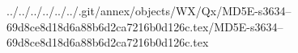 ../../../../../../.git/annex/objects/WX/Qx/MD5E-s3634--69d8ce8d18d6a88b6d2ca7216b0d126c.tex/MD5E-s3634--69d8ce8d18d6a88b6d2ca7216b0d126c.tex